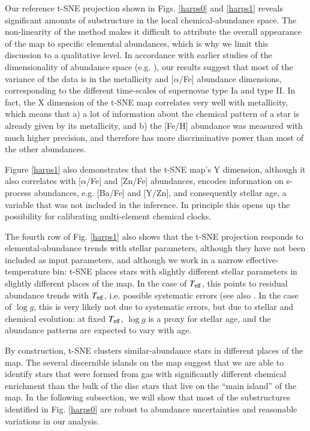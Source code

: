 \documentclass{aa}  %
\begin{document}
Our reference t-SNE projection shown in Figs. \ref{harps0} and \ref{harps1} reveals significant amounts of substructure in the local chemical-abundance space. The non-linearity of the method makes it difficult to attribute the overall appearance of the map to specific elemental abundances, which is why we limit this discussion to a qualitative level. In accordance with earlier studies of the dimensionality of abundance space (e.g. \citealt{Ting2012, Boesso2018}), our results suggest that most of the variance of the data is in the metallicity and [$\alpha$/Fe] abundance dimensions, corresponding to the different time-scales of supernovae type Ia and type II. In fact, the X dimension of the t-SNE map correlates very well with metallicity, which means that a) a lot of information about the chemical pattern of a star is already given by its metallicity, and b) the [Fe/H] abundance was measured with much higher precision, and therefore has more discriminative power than most of the other abundances. 

Figure \ref{harps1} also demonstrates that the t-SNE map's Y dimension, although it also correlates with [$\alpha$/Fe] and [Zn/Fe] abundances, encodes information on s-process abundances, e.g. [Ba/Fe] and [Y/Zn], and consequently stellar age, a variable that was not included in the inference. In principle this opens up the possibility for calibrating multi-element chemical clocks.%

The fourth row of Fig. \ref{harps1} also shows that the t-SNE projection responds to elemental-abundance trends with stellar parameters, although they have not been included as input parameters, and although we work in a narrow effective-temperature bin: t-SNE places stars with slightly different stellar parameters in slightly different places of the map. In the case of $T_{\rm eff}$, this points to residual abundance trends with $T_{\rm eff}$, i.e. possible systematic errors (see also \citealt{DelgadoMena2017}. In the case of $\log g$, this is very likely not due to systematic errors, but due to stellar and chemical evolution: at fixed $T_{\rm eff}$, $\log g$ is a proxy for stellar age, and the abundance patterns are expected to vary with age.

By construction, t-SNE clusters similar-abundance stars in different places of the map. The several discernible islands on the map suggest that we are able to identify stars that were formed from gas with significantly different chemical enrichment than the bulk of the disc stars that live on the ``main island'' of the map. In the following subsection, we will show that most of the substructures identified in Fig. \ref{harps0} are robust to abundance uncertainties and reasonable variations in our analysis.
\end{document}
